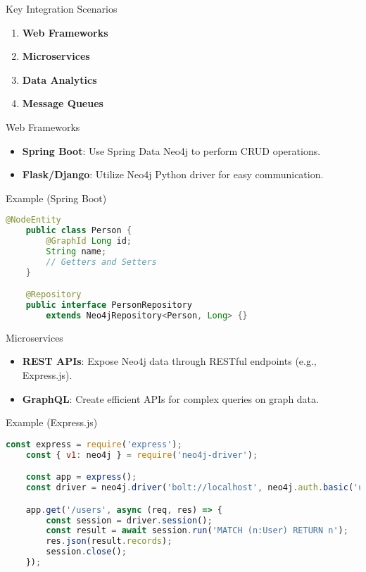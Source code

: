 \documentclass[aspectratio=169]{beamer}
\begin{document}
\begin{frame}{Key Integration Scenarios}
  \begin{enumerate}
    \item \textbf{Web Frameworks}
    \item \textbf{Microservices}
    \item \textbf{Data Analytics}
    \item \textbf{Message Queues}
  \end{enumerate}
\end{frame}

\begin{frame}[fragile]{Web Frameworks}
  \begin{itemize}
    \item \textbf{Spring Boot}: Use Spring Data Neo4j to perform CRUD operations.
    \item \textbf{Flask/Django}: Utilize Neo4j Python driver for easy communication.
  \end{itemize}

  \begin{block}{Example (Spring Boot)}
    \begin{lstlisting}[language=Java]
    @NodeEntity
    public class Person {
        @GraphId Long id;
        String name;
        // Getters and Setters
    }

    @Repository
    public interface PersonRepository 
        extends Neo4jRepository<Person, Long> {}
    \end{lstlisting}
  \end{block}
\end{frame}

\begin{frame}[fragile]{Microservices}
  \begin{itemize}
    \item \textbf{REST APIs}: Expose Neo4j data through RESTful endpoints (e.g., Express.js).
    \item \textbf{GraphQL}: Create efficient APIs for complex queries on graph data.
  \end{itemize}

  \begin{block}{Example (Express.js)}
    \begin{lstlisting}[language=JavaScript]
    const express = require('express');
    const { v1: neo4j } = require('neo4j-driver');

    const app = express();
    const driver = neo4j.driver('bolt://localhost', neo4j.auth.basic('username', 'password'));

    app.get('/users', async (req, res) => {
        const session = driver.session();
        const result = await session.run('MATCH (n:User) RETURN n');
        res.json(result.records);
        session.close();
    });
    \end{lstlisting}
  \end{block}
\end{frame}
\end{document}
